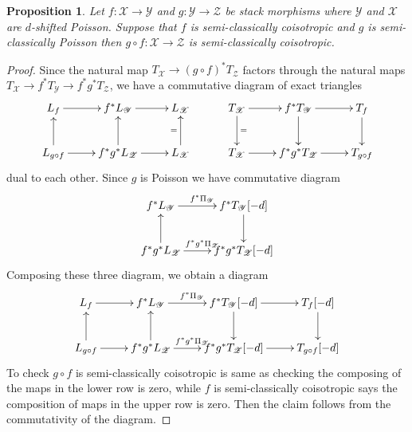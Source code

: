 \documentclass[reqno]{amsart}
\newtheorem{prop}[theorem]{Proposition}
\theoremstyle{definition}
\theoremstyle{remark}
\newcommand{\sX}{\mathscr{X}}
\newcommand{\sY}{\mathscr{Y}}
\newcommand{\sZ}{\mathscr{Z}}
\numberwithin{equation}{section}
\begin{document}
\begin{prop} \label{poisson+coisotropic}
Let $f:\sX\to\sY$ and $g:\sY\to\sZ$ be stack morphisms where $\sY$ and $\sX$ are $d$-shifted Poisson.
Suppose that $f$ is semi-classically coisotropic and $g$ is semi-classically Poisson then $g\circ f:\sX\to\sZ$ is semi-classically coisotropic. 
\end{prop}
\begin{proof}
Since the natural map $T_\sX\to (g\circ f)^* T_\sZ$ factors through the natural maps $T_\sX\to f^*T_\sY\to f^*g^*T_\sZ$, we have a commutative diagram of exact triangles
\[
\xymatrix{
 L_f\ar[r] &f^*L_\sY\ar[r] &L_\sX\\
L_{g\circ f}\ar[r]\ar[u] & f^*g^*L_\sZ\ar[r]\ar[u] & L_\sX\ar[u]^=
} \hspace{1cm}
\xymatrix{
 T_\sX\ar[r]\ar[d]^= &f^*T_\sY\ar[r]\ar[d] &T_f\ar[d]\\
T_\sX\ar[r] & f^*g^*T_\sZ\ar[r] & T_{g\circ f}
} 
\] dual to each other.
 Since $g$ is Poisson we have commutative diagram
\[
\xymatrix{
f^*L_{\sY}\ar[r]^{f^*\Pi_{\sY}} &f^* T_{\sY}[-d]\ar[d] \\
f^*g^*L_{\sZ}\ar[u]\ar[r]^{f^*g^*\Pi_{\sZ}} & f^*g^*T_{\sZ}[-d]
}
\] Composing these three diagram, we obtain a diagram
\[
\xymatrix{
L_f\ar[r] &f^*L_{\sY}\ar[r]^{f^*\Pi_{\sY}} &f^* T_{\sY}[-d]\ar[d]\ar[r]&T_f[-d]\ar[d] \\
L_{g\circ f}\ar[r]\ar[u] &f^*g^*L_{\sZ}\ar[u]\ar[r]^{f^*g^*\Pi_{\sZ}} & f^*g^*T_{\sZ}[-d]\ar[r]& T_{g\circ f}[-d]
}
\]
To check $g\circ f$ is semi-classically  coisotropic is same as checking the composing of the maps in the lower row is zero, while $f$ is semi-classically coisotropic says the composition of maps in the upper row is zero. Then the claim follows from the commutativity of the diagram.
\end{proof}
\end{document}
